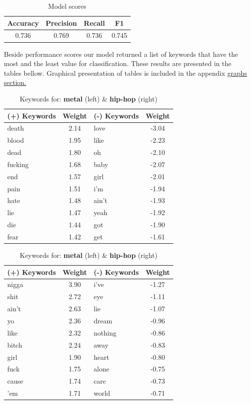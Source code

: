 \documentclass[a4paper,11pt]{article}
\begin{document}
\begin{table}[h!]
\centering
\label{baseline}
\begin{tabular}{|c|c|c|c|}
\hline
Accuracy & Precision & Recall & F1 \\
\hline
0.736 & 0.769 & 0.736 & 0.745 \\
\hline
\end{tabular}
\label{label-model-score}
\caption{Model scores}
\end{table}

\noindent Beside performance scores our model returned a list of keywords that have the most and the least value for classification. These results are presented in the tables bellow. Graphical presentation of tables is included in the appendix \hyperref[label-graphs]{graphs section.}

\begin{table}[h!]
\begin{tabular}{|lc|lc|}
\hline
(+) Keywords & Weight & (-) Keywords & Weight \\
\hline
death & 2.14 & love & -3.04 \\
blood & 1.95 & like & -2.23 \\
dead & 1.80 & oh & -2.10 \\
fucking & 1.68 & baby & -2.07 \\
end & 1.57 & girl & -2.01 \\
pain & 1.51 & i'm & -1.94 \\
hate & 1.48 & ain't & -1.93 \\
lie & 1.47 & yeah & -1.92 \\
die & 1.44 & got & -1.90 \\
fear & 1.42 & get & -1.61 \\
\hline
\end{tabular}
\quad
\begin{tabular}{|lc|lc|}
\hline
(+) Keywords & Weight & (-) Keywords & Weight \\
\hline
nigga & 3.90 & i've & -1.27 \\
shit & 2.72 & eye & -1.11 \\
ain't & 2.63 & lie & -1.07 \\
yo & 2.36 & dream & -0.96 \\
like & 2.32 & nothing & -0.86 \\
bitch & 2.24 & away & -0.83 \\
girl & 1.90 & heart & -0.80 \\
fuck & 1.75 & alone & -0.75 \\
cause & 1.74 & care & -0.73 \\
'em & 1.71 & world & -0.71 \\
\hline
\end{tabular}
\caption{Keywords for: \textbf{metal} (left) \& \textbf{hip-hop} (right)}
\end{table}
\end{document}
